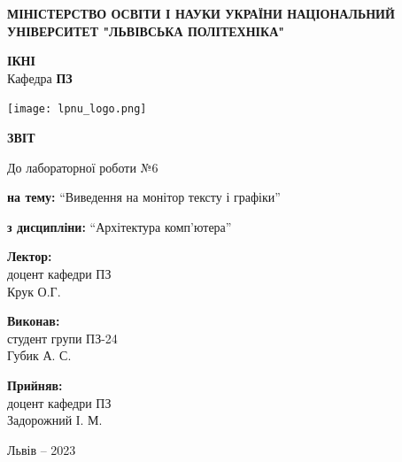 \documentclass[12pt]{extarticle}
\begin{document}
\begin{titlepage}
    \begin{center}
        \textbf{\normalsize{\MakeUppercase{
            Міністерство Освіти і науки України
            Національний університет "Львівська політехніка"
        }}}

        \begin{flushright}
        \textbf{ІКНІ}\\
        Кафедра \textbf{ПЗ}
        \end{flushright}
        \vspace{15mm}

        \texttt{[image: lpnu\_logo.png]}

        \vspace*{\fill}

        \textbf{\normalsize{\MakeUppercase{Звіт}}}
            
        До лабораторної роботи №6

        \textbf{на тему:} “Виведення на монітор тексту і графіки”

        \textbf{з дисципліни:} “Архітектура комп’ютера”
            
        \vspace*{\fill}

        \begin{flushright}

            \textbf{Лектор:}\\
            доцент кафедри ПЗ\\
            Крук О.Г.\\
            \vspace{12pt}

            \textbf{Виконав:}\\
            студент групи ПЗ-24\\
            Губик А. С.\\
            \vspace{12pt}

            \textbf{Прийняв:}\\
            доцент кафедри ПЗ\\
            Задорожний І. М.\\
        \vspace{12pt}
        \end{flushright}

        Львів -- 2023
            
            
    \end{center}
\end{titlepage}
\end{document}
